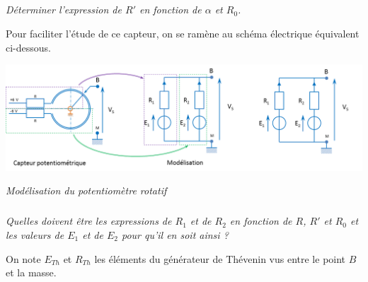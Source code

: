 \documentclass[10pt]{article}
\newif\ifprof
\begin{document}
\subparagraph{}
\textit{Déterminer l'expression de $R'$ en fonction de $\alpha$ et $R_0$. }
 
\ifprof
\begin{corrige}
Lorsque $\alpha = -\pi$, $R' = 0$; lorsque $\alpha = \pi$, $R' = R_0 $. La variation de résistance est proportionnelle au secteur angulaire, on a donc : 
$$ R' (\alpha)= \dfrac{R_0}{2} + \dfrac{R_0}{2\pi} \alpha  $$
\end{corrige}
\else
\fi

Pour faciliter l'étude de ce capteur, on se ramène au schéma électrique équivalent ci-dessous.

\begin{center}
\includegraphics[width=\textwidth]{images/modele}

\textit{Modélisation du potentiomètre rotatif}
\end{center}

\subparagraph{}
\textit{Quelles doivent être les expressions de $R_1$ et de $R_2$ en fonction de $R$, $R'$ et $R_0$ et les valeurs de $E_1$ et de $E_2$ pour qu'il en soit ainsi ?}
\ifprof
\begin{corrige}

Pour que la modélisation soit conforme au capteur initial, il faut nécessairement que : 
\begin{itemize}
\item $R_1 = R + R_0 - R'$;
\item $R_2 = R + R'$;
\item $E_1 = +6 V$; 
\item $E_2 = -6 V$.
\end{itemize}
\end{corrige}
\else
\fi

On note $E_{Th}$ et $R_{Th}$ les éléments du générateur de Thévenin vus entre le point $B$ et la masse. 
\end{document}
